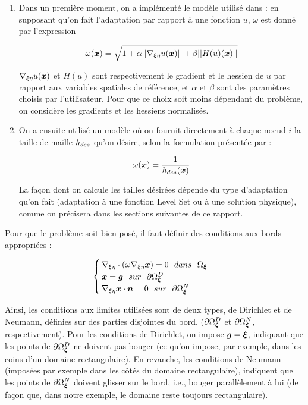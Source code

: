 \begin{enumerate}
	\item Dans un première moment, on a implémenté le modèle utilisé dans \cite{arpaia} : en supposant qu'on fait l'adaptation par rapport à une fonction \(u\), \(\omega\) est donné par l'expression

	\begin{equation*}
  		\omega(\boldsymbol{x}) = \sqrt{1 + \alpha ||\nabla_{\xi\eta} u(\boldsymbol{x})|| + \beta ||H(u)(\boldsymbol{x})||}
	\end{equation*}

	\indent $\nabla_{\xi\eta} u(\boldsymbol{x})$ et \(H(u)\) sont respectivement le gradient et le hessien de \(u\) par rapport aux variables spatiales de référence, et \(\alpha\) et \(\beta\) sont des paramètres choisis par l'utilisateur. Pour que ce choix soit moins dépendant du problème, on considère les gradients et les hessiens normalisés.
	
	\item On a ensuite utilisé un modèle où on fournit directement à chaque noeud \(i\) la taille de maille \(h_{des}\) qu'on désire, selon la formulation présentée par \cite{askes} : 
	
	\begin{equation}
		\label{eq:omega2}
		\omega(\boldsymbol{x}) = \frac{1}{h_{des}(\boldsymbol{x})}
	\end{equation}
	
	\indent La façon dont on calcule les tailles désirées dépende du type d'adaptation qu'on fait (adaptation à une fonction Level Set ou à une solution physique), comme on précisera dans les sections suivantes de ce rapport.
	
	
\end{enumerate} 

\indent Pour que le problème soit bien posé, il faut définir des conditions aux bords appropriées : 

\begin{equation}
	\label{eq:systeme}
	\begin{cases}
  		\nabref \cdot \left( \omega \nabref \vecx \right) = 0 \ \ dans \ \ \domRef \\
  		\vecx = \vecg \ \ sur \ \ \bordRef^D \\
  		\nabref \vecx \cdot \vecn = 0 \ \ sur \ \ \bordRef^N 
	\end{cases}
\end{equation}

\indent Ainsi, les conditions aux limites utilisées sont de deux types, de Dirichlet et de Neumann, définies sur des parties disjointes du bord, (\(\partial \Omega_{\boldsymbol{\xi}}^D\) et \(\partial \Omega_{\boldsymbol{\xi}}^N\), respectivement). Pour les conditions de Dirichlet, on impose \(\boldsymbol{g} = \boldsymbol{\xi}\), indiquant que les points de \(\partial \Omega_{\boldsymbol{\xi}}^D\) ne doivent pas bouger (ce qu'on impose, par exemple, dans les coins d'un domaine rectangulaire). En revanche, les conditions de Neumann (imposées par exemple dans les côtés du domaine rectangulaire), indiquent que les points de \(\partial \Omega_{\boldsymbol{\xi}}^N\) doivent glisser sur le bord, i.e., bouger parallèlement à lui (de façon que, dans notre exemple, le domaine reste toujours rectangulaire).

